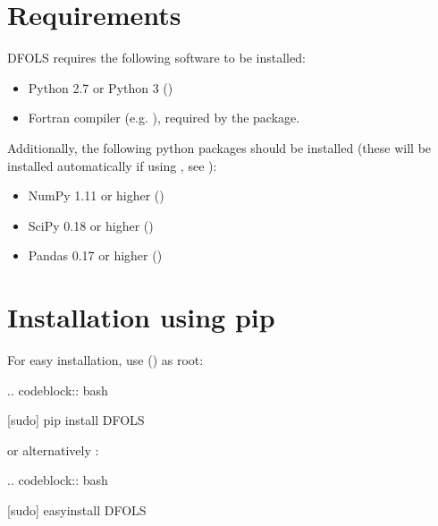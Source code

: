 \documentclass[letterpaper,10pt,english]{sphinxmanual}
\begin{document}
\section{Requirements}
\label{\detokenize{install:requirements}}
DFO\sphinxhyphen{}LS requires the following software to be installed:
\begin{itemize}
\item {} 
Python 2.7 or Python 3 ()

\item {} 
Fortran compiler (e.g. ), required by the  package.

\end{itemize}

Additionally, the following python packages should be installed (these will be installed automatically if using , see {\hyperref[\detokenize{install:installation-using-pip}]{}}):
\begin{itemize}
\item {} 
NumPy 1.11 or higher ()

\item {} 
SciPy 0.18 or higher ()

\item {} 
Pandas 0.17 or higher ()

\end{itemize}


\section{Installation using pip}
\label{\detokenize{install:installation-using-pip}}
For easy installation, use  () as root:

\begin{sphinxVerbatim}[commandchars=\\\{\}]
.. code\PYGZhy{}block:: bash

   \PYGZdl{} [sudo] pip install DFO\PYGZhy{}LS
\end{sphinxVerbatim}

or alternatively :

\begin{sphinxVerbatim}[commandchars=\\\{\}]
.. code\PYGZhy{}block:: bash

   \PYGZdl{} [sudo] easy\PYGZus{}install DFO\PYGZhy{}LS
\end{sphinxVerbatim}
\end{document}
